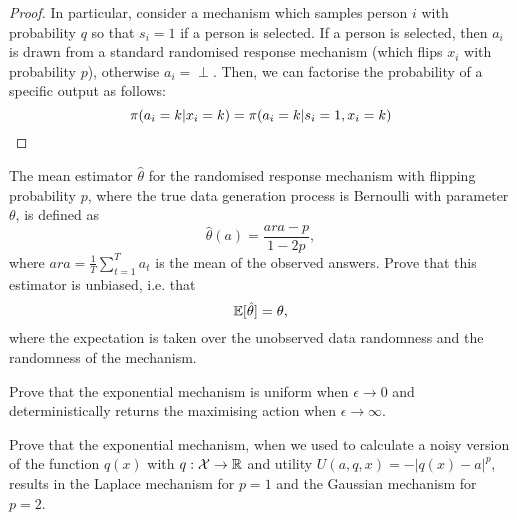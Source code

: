 {\begin{proof}
      In particular, consider a mechanism which samples person $i$ with
      probability $q$ so that $s_i = 1$ if a person is selected. If a
      person is selected, then $a_i$ is drawn from a standard randomised
      response mechanism (which flips $x_i$ with probability $p$),
      otherwise $a_i = \perp$.  Then, we can factorise the probability
      of a specific output as follows:
      \[
        \pi(a_i = k | x_i = k) =  \pi(a_i = k | s_i = 1, x_i = k) 
      \]
    \end{proof}
  \fi
  \begin{exercise}
    The mean estimator $\hat{\theta}$ for the randomised response mechanism with flipping probability $p$, where the true data generation process is Bernoulli with parameter $\theta$, is defined as
    \[
      \hat{\theta}(a) = \frac{ar{a} - p}{1 - 2p},
    \]
    where $ar{a} = \frac{1}{T} \sum_{t=1}^T a_t$ is the mean of the observed answers. Prove that this estimator is unbiased, i.e. that
    \[
      \mathop{\mbox{\ensuremath{\mathbb{E}}}}\nolimits[\hat{\theta}] = \theta,
    \]
    where the expectation is taken over the unobserved data randomness and the randomness of the mechanism.
    \label{exer:rp-unbiased-estimator}
  \end{exercise}
  
  \begin{exercise}
    Prove that the exponential mechanism is uniform when $\epsilon \to 0$ and deterministically returns the maximising action when $\epsilon \to \infty$.
    \label{exer:exp-randomness}
  \end{exercise}

  \begin{exercise}
    Prove that the exponential mechanism, when we used to calculate a noisy version of the function $q(x)$ with $q : {\mathcal{X}} \to {\mathbb{R}}$ and utility $U(a,q,x) = -|q(x) - a|^p$, results in the Laplace mechanism for $p=1$ and the Gaussian mechanism for $p = 2$.
    \label{exer:exp-laplace-gauss}
  \end{exercise}

}
